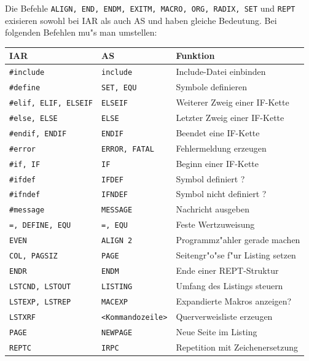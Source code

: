 \documentclass[12pt,a4paper,twoside]{report}
\newcommand{\tty}[1]{{\tt #1}}
\newcommand{\asname}{AS}
\begin{document}
Die Befehle \tty{ALIGN, END, ENDM, EXITM, MACRO, ORG, RADIX, SET} und
\tty{REPT} exisieren sowohl bei IAR als auch \asname{} und haben gleiche
Bedeutung.  Bei folgenden Befehlen mu"s man umstellen:

\begin{table}[htb]
\begin{center}\begin{tabular}{|l|l|l|}
\hline
IAR & \asname{} & Funktion\\
\hline
\hline
\tty{\#include} & \tty{include} & Include-Datei einbinden \\
\tty{\#define} & \tty{SET, EQU} & Symbole definieren \\
\tty{\#elif, ELIF, ELSEIF} & \tty{ELSEIF} & Weiterer Zweig einer IF-Kette \\
\tty{\#else, ELSE} & \tty{ELSE} & Letzter Zweig einer IF-Kette \\
\tty{\#endif, ENDIF} & \tty{ENDIF} & Beendet eine IF-Kette \\
\tty{\#error} & \tty{ERROR, FATAL} & Fehlermeldung erzeugen \\
\tty{\#if, IF} & \tty{IF} & Beginn einer IF-Kette\\
\tty{\#ifdef} & \tty{IFDEF} & Symbol definiert ? \\
\tty{\#ifndef} & \tty{IFNDEF} & Symbol nicht definiert ? \\
\tty{\#message} & \tty{MESSAGE} & Nachricht ausgeben \\
\tty{=, DEFINE, EQU} & \tty{=, EQU} & Feste Wertzuweisung \\
\tty{EVEN} & \tty{ALIGN 2} & Programmz"ahler gerade machen \\
\tty{COL, PAGSIZ} & \tty{PAGE} & Seitengr"o"se f"ur Listing setzen \\
\tty{ENDR} & \tty{ENDM} & Ende einer REPT-Struktur \\
\tty{LSTCND, LSTOUT} & \tty{LISTING} & Umfang des Listings steuern \\
\tty{LSTEXP, LSTREP} & \tty{MACEXP} & Expandierte Makros anzeigen? \\
\tty{LSTXRF} & \verb!<Kommandozeile>! & Querverweisliste erzeugen \\
\tty{PAGE} & \tty{NEWPAGE} & Neue Seite im Listing \\
\tty{REPTC} & \tty{IRPC} & Repetition mit Zeichenersetzung \\
\hline
\end{tabular}\end{center}
\end{table}
\end{document}

